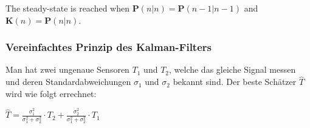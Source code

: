 The steady-state is reached when $\mathbf{P}(n|n) = \mathbf{P}(n-1 | n-1)$ and $\mathbf{K}(n) = \mathbf{P}(n|n)$.

\subsubsection{Vereinfachtes Prinzip des Kalman-Filters}
\begin{minipage}{14.5cm}
Man hat zwei ungenaue Sensoren $T_1$ und $T_2$, welche das gleiche Signal messen und deren Standardabweichungen $\sigma_1$ und $\sigma_2$ bekannt sind. Der beste
Schätzer $\hat{T}$ wird wie folgt errechnet:\\
\end{minipage}
\hspace{0.25cm}
\begin{minipage}{5cm}
$\hat{T}=\frac{\sigma_1^2}{\sigma_1^2+\sigma_2^2}\cdot T_2+\frac{\sigma_2^2}{\sigma_1^2+\sigma_2^2}\cdot T_1$
\end{minipage}
